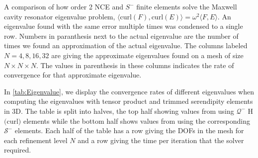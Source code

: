 \documentclass[format=acmsmall,screen,timestamp=false,a4paper]{acmart}
\newcommand{\calQ}{\mathcal{Q}}
\newcommand{\calS}{\mathcal{S}}
\begin{document}
\begin{table}[htbp]
\caption{A comparison of how order 2 NCE and $S^-$ finite elements solve the Maxwell cavity resonator eigenvalue problem, $\langle \text{curl}(F), \text{curl}(E) \rangle = \omega^2 \langle F, E \rangle$. An eigenvalue found with the same error multiple times was condensed to a single row.  Numbers in paranthesis next to the actual eigenvalue are the number of times we found an approximation of the actual eigenvalue.  The columns labeled $N=4, 8, 16, 32$ are giving the approximate eigenvalues found on a mesh of size $N \times N \times N$.  The values in parenthesis in these columns indicates the rate of convergence for that approximate eigenvalue.
\label{tab:Eigenvalue} }
\end{table}

In \cref{tab:Eigenvalue}, we display the convergence rates of different eigenvalues when computing the eigenvalues with tensor product and trimmed serendipity elements in 3D.  The table is split into halves, the top half showing values from using $\mathcal{Q}^-$ H$($curl$)$ elements while the bottom half shows values from using the corresponding $\mathcal{S}^-$ elements.  Each half of the table has a row giving the DOFs in the mesh for each refinement level $N$ and a row giving the time per iteration that the solver required.  

\end{document}
